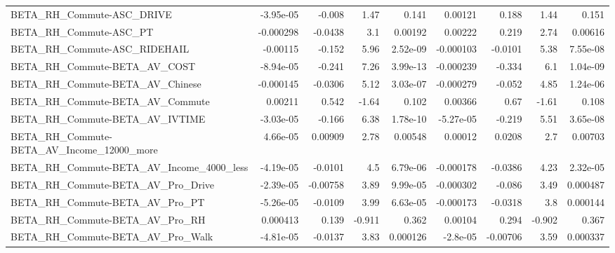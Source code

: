 \begin{tabular}{lrrrrrrrr}
BETA\_RH\_Commute-ASC\_DRIVE                          &   -3.95e-05 &       -0.008 &      1.47 &    0.141 &    0.00121 &       0.188 &         1.44 &         0.151 \\
BETA\_RH\_Commute-ASC\_PT                             &   -0.000298 &      -0.0438 &       3.1 &  0.00192 &    0.00222 &       0.219 &         2.74 &       0.00616 \\
BETA\_RH\_Commute-ASC\_RIDEHAIL                       &    -0.00115 &       -0.152 &      5.96 & 2.52e-09 &  -0.000103 &     -0.0101 &         5.38 &      7.55e-08 \\
BETA\_RH\_Commute-BETA\_AV\_COST                       &   -8.94e-05 &       -0.241 &      7.26 & 3.99e-13 &  -0.000239 &      -0.334 &          6.1 &      1.04e-09 \\
BETA\_RH\_Commute-BETA\_AV\_Chinese                    &   -0.000145 &      -0.0306 &      5.12 & 3.03e-07 &  -0.000279 &      -0.052 &         4.85 &      1.24e-06 \\
BETA\_RH\_Commute-BETA\_AV\_Commute                    &     0.00211 &        0.542 &     -1.64 &    0.102 &    0.00366 &        0.67 &        -1.61 &         0.108 \\
BETA\_RH\_Commute-BETA\_AV\_IVTIME                     &   -3.03e-05 &       -0.166 &      6.38 & 1.78e-10 &  -5.27e-05 &      -0.219 &         5.51 &      3.65e-08 \\
BETA\_RH\_Commute-BETA\_AV\_Income\_12000\_more          &    4.66e-05 &      0.00909 &      2.78 &  0.00548 &    0.00012 &      0.0208 &          2.7 &       0.00703 \\
BETA\_RH\_Commute-BETA\_AV\_Income\_4000\_less           &   -4.19e-05 &      -0.0101 &       4.5 & 6.79e-06 &  -0.000178 &     -0.0386 &         4.23 &      2.32e-05 \\
BETA\_RH\_Commute-BETA\_AV\_Pro\_Drive                  &   -2.39e-05 &     -0.00758 &      3.89 & 9.99e-05 &  -0.000302 &      -0.086 &         3.49 &      0.000487 \\
BETA\_RH\_Commute-BETA\_AV\_Pro\_PT                     &   -5.26e-05 &      -0.0109 &      3.99 & 6.63e-05 &  -0.000173 &     -0.0318 &          3.8 &      0.000144 \\
BETA\_RH\_Commute-BETA\_AV\_Pro\_RH                     &    0.000413 &        0.139 &    -0.911 &    0.362 &    0.00104 &       0.294 &       -0.902 &         0.367 \\
BETA\_RH\_Commute-BETA\_AV\_Pro\_Walk                   &   -4.81e-05 &      -0.0137 &      3.83 & 0.000126 &   -2.8e-05 &    -0.00706 &         3.59 &      0.000337 \\

\end{tabular}
